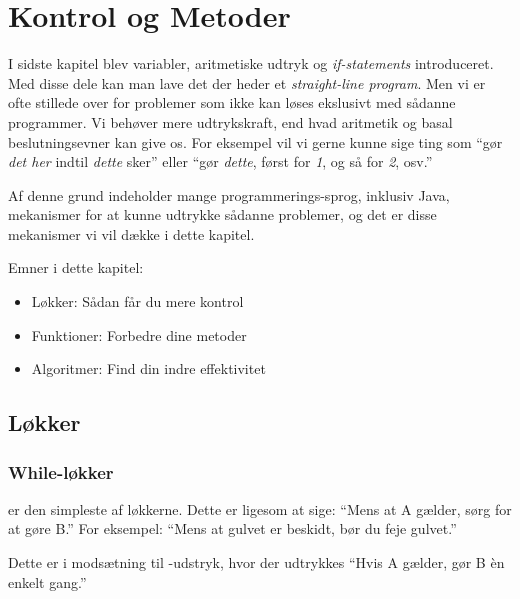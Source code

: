 

\chapter{Kontrol og Metoder}

	I sidste kapitel blev variabler, aritmetiske udtryk og \emph{if-statements}
	introduceret. Med disse dele kan man lave det der heder et
	\emph{straight-line program}. Men vi er ofte stillede over for problemer som
	ikke kan løses ekslusivt med sådanne programmer. Vi behøver mere
	udtrykskraft, end hvad aritmetik og basal beslutningsevner kan give os.
	For eksempel vil vi gerne kunne sige ting som ``gør \emph{det her} indtil
	\emph{dette} sker'' eller ``gør \emph{dette}, først for \emph{1}, og så for
	\emph{2}, osv.''

	Af denne grund indeholder mange programmerings-sprog, inklusiv Java,
	mekanismer for at kunne udtrykke sådanne problemer, og det er disse
	mekanismer vi vil dække i dette kapitel.

	Emner i dette kapitel:

	\begin{itemize} %
		\item Løkker: Sådan får du mere kontrol
		\item Funktioner: Forbedre dine metoder
		\item Algoritmer: Find din indre effektivitet
	\end{itemize}

\section{Løkker}

	\subsection{While-løkker}

		 er den simpleste af løkkerne. Dette er ligesom at
		sige: ``Mens at A gælder, sørg for at gøre B.'' For eksempel:
		``Mens at gulvet er beskidt, bør du feje gulvet.''

		Dette er i modsætning til -udstryk, hvor der udtrykkes
		``Hvis A gælder, gør B èn enkelt gang.''


